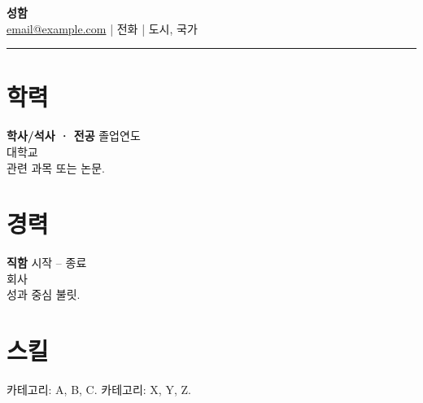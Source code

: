 \documentclass[11pt,a4paper]{article}
\begin{document}
\begin{center}
{\LARGE \textbf{성함}}\\[0.3em]
\href{mailto:email@example.com}{email@example.com} \quad | \quad 전화 \quad | \quad 도시, 국가
\end{center}
\begin{flushright}\rule{2cm}{2.5cm}\end{flushright}
\vspace{0.6em}
\section*{학력}
\textbf{학사/석사 · 전공} \hfill 졸업연도 \\
대학교 \\
관련 과목 또는 논문.

\section*{경력}
\textbf{직함} \hfill 시작 -- 종료 \\
회사 \\
성과 중심 불릿.

\section*{스킬}
카테고리: A, B, C. \quad 카테고리: X, Y, Z.
\end{document}

